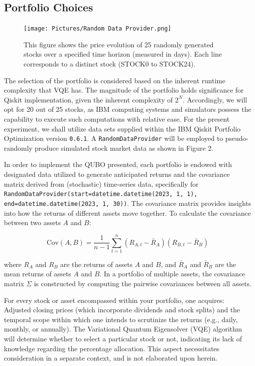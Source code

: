 \documentclass[%
 reprint,
 amsmath,amssymb,
 aps,
]{revtex4-2}
\begin{document}
\subsection{Portfolio Choices}
\begin{figure}[b]
\texttt{[image: Pictures/Random Data Provider.png]}
\caption{\label{fig:data} 
This figure shows the price evolution of 25 randomly generated stocks over a specified time horizon (measured in days). Each line corresponds to a distinct stock (STOCK0 to STOCK24).
}
\end{figure}
The selection of the portfolio is considered based on the inherent runtime complexity that VQE has. The magnitude of the portfolio holds significance for Qiskit implementation, given the inherent complexity of $2^N$. Accordingly, we will opt for 20 out of 25 stocks, as IBM computing systems and simulators possess the capability to execute such computations with relative ease. For the present experiment, we shall utilize data sets supplied within the IBM Qiskit Portfolio Optimization version \texttt{0.6.1}. A \texttt{RandomDataProvider} will be employed to pseudo-randomly produce simulated stock market data as shown in Figure 2. 

In order to implement the QUBO presented, each portfolio is endowed with designated data utilized to generate anticipated returns and the covariance matrix derived from (stochastic) time-series data, specifically for \texttt{RandomDataProvider(start=datetime.datetime(2023, 1, 1), end=datetime.datetime(2023, 1, 30))}. The covariance matrix provides insights into how the returns of different assets move together. To calculate the covariance between two assets \( A \) and \( B \):

\[
\text{Cov}(A,B) = \frac{1}{n-1} \sum_{t=1}^{n} \left( R_{A,t} - \bar{R}_A \right)\left( R_{B,t} - \bar{R}_B \right)
\]

where \( R_A \) and \( R_B \) are the returns of assets \( A \) and \( B \), and \( \bar{R}_A \) and \( \bar{R}_B \) are the mean returns of assets \( A \) and \( B \). In a portfolio of multiple assets, the covariance matrix \( \Sigma \) is constructed by computing the pairwise covariances between all assets.

For every stock or asset encompassed within your portfolio, one acquires: Adjusted closing prices (which incorporate dividends and stock splits) and the temporal scope within which one intends to scrutinize the returns (e.g., daily, monthly, or annually). The Variational Quantum Eigensolver (VQE) algorithm will determine whether to select a particular stock or not, indicating its lack of knowledge regarding the percentage allocation. This aspect necessitates consideration in a separate context, and is not elaborated upon herein.
\end{document}
